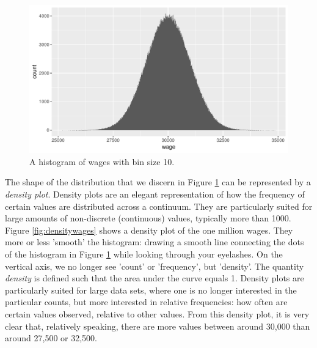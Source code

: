 \documentclass[]{report}\usepackage[]{graphicx}\usepackage[]{color}
\makeatletter
\def\maxwidth{ %
  \ifdim\Gin@nat@width>\linewidth
    \linewidth
  \else
    \Gin@nat@width
  \fi
}
\newenvironment{knitrout}{}{} %
\makeatother
\begin{document}
\begin{knitrout}
\color{fgcolor}\begin{figure}

{\centering \includegraphics[width=\maxwidth]{figure/histbin2-1} 

}

\caption[A histogram of wages with bin size 10]{A histogram of wages with bin size 10.}\label{fig:histbin2}
\end{figure}


\end{knitrout}

The shape of the distribution that we discern in Figure \ref{fig:histbin2} can be represented by a \textit{density plot}. Density plots are an elegant representation of how the frequency of certain values are distributed across a continuum. They are particularly suited for large amounts of non-discrete (continuous) values, typically more than 1000. Figure \ref{fig:densitywages} shows a density plot of the one million wages. They more or less 'smooth' the histogram: drawing a smooth line connecting the dots of the histogram in Figure \ref{fig:histbin2} while looking through your eyelashes. On the vertical axis, we no longer see 'count' or 'frequency', but 'density'. The quantity \textit{density} is defined such that the area under the curve equals 1. Density plots are particularly suited for large data sets, where one is no longer interested in the particular counts, but  more interested in relative frequencies: how often are certain values observed, relative to other values. From this density plot, it is very clear that, relatively speaking, there are more values between around 30,000 than around 27,500 or 32,500.
\end{document}

